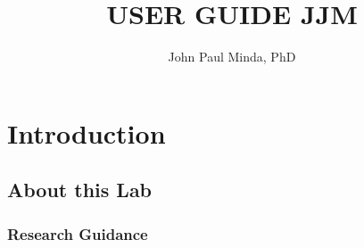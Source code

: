 \documentclass{article}
\title{USER GUIDE JJM}
\author{John Paul Minda, PhD}
\begin{document}
\maketitle
\tableofcontents

\section{Introduction} 

\subsection{About this Lab}

\subsubsection{Research Guidance} 
\end{document}
